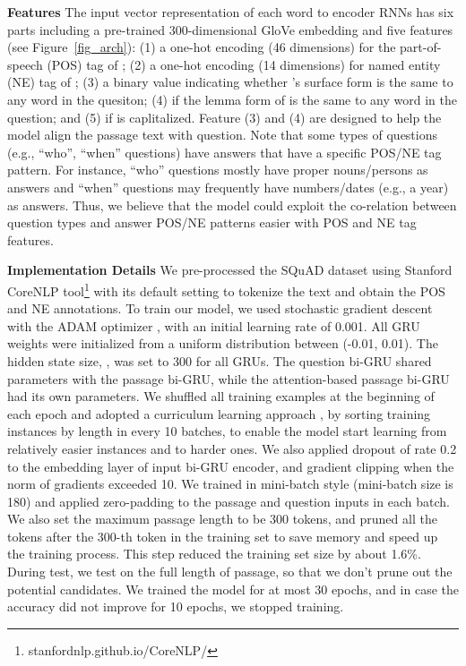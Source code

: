 \documentclass[letterpaper]{article}
\begin{document}
\noindent\textbf{{Features}}
The input vector representation of each word  to encoder RNNs has six parts including a pre-trained 300-dimensional GloVe embedding \cite{pennington2014glove} and five features (see Figure~\ref{fig_arch}): (1) a one-hot encoding (46 dimensions) for the part-of-speech (POS) tag of ; (2) a one-hot encoding (14 dimensions) for named entity (NE) tag of ; (3) a binary value indicating whether 's surface form is the same to any word in the quesiton; (4) if the lemma form of  is the same to any word in the question; and (5) if  is caplitalized. Feature (3) and (4) are designed to help the model align the passage text with question. Note that some types of questions (e.g., ``who'', ``when'' questions) have answers that have a specific POS/NE tag pattern. For instance, ``who'' questions mostly have proper nouns/persons as answers and ``when'' questions may frequently have numbers/dates (e.g., a year) as answers. Thus, we believe that the model could exploit the co-relation between question types and answer POS/NE patterns easier with POS and NE tag features. 







\noindent\textbf{Implementation Details}
We pre-processed the SQuAD dataset using Stanford CoreNLP tool\footnote{ stanfordnlp.github.io/CoreNLP/} \cite{manning-EtAl:2014:P14-5} with its default setting to tokenize the text and obtain the POS and NE annotations. To train our model, we used stochastic gradient descent with the ADAM optimizer \cite{kingma2014adam}, with an initial learning rate of 0.001. All GRU weights were initialized from a uniform distribution between (-0.01, 0.01). The hidden state size, , was set to 300 for all GRUs. The question bi-GRU shared parameters with the passage bi-GRU, while the attention-based passage bi-GRU had its own parameters. We shuffled all training examples at the beginning of each epoch and adopted a curriculum learning approach \cite{bengio2009curriculum}, by sorting training instances by length in every 10 batches, to enable the model start learning from relatively easier instances and to harder ones.
We also applied dropout of rate 0.2 to the embedding layer of input bi-GRU encoder, and gradient clipping when the norm of gradients exceeded 10. We trained in mini-batch style (mini-batch size is 180) and applied zero-padding to the passage and question inputs in each batch. We also set the maximum passage length to be 300 tokens, and pruned all the tokens after the 300-th token in the training set to save memory and speed up the training process. This step reduced the training set size by about 1.6\%. During test, we test on the full length of passage, so that we don't prune out the potential candidates. We trained the model for at most 30 epochs, and in case the accuracy did not improve for 10 epochs, we stopped training. 
\end{document}
